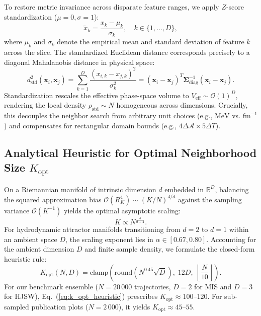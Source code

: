 To restore metric invariance across disparate feature ranges, we apply $Z$-score standardization (${\mu=0, \sigma=1}$):
\begin{equation}
    \tilde{x}_{k} = \frac{x_k - \mu_k}{\sigma_k}, \quad k \in \{1, \dots, D\},
\end{equation}
where $\mu_k$ and $\sigma_k$ denote the empirical mean and standard deviation of feature $k$ across the slice. The standardized Euclidean distance corresponds precisely to a diagonal Mahalanobis distance in physical space:
\begin{equation}
    d_{\mathrm{std}}^2(\mathbf{x}_i, \mathbf{x}_j) = \sum_{k=1}^D \frac{(x_{i,k} - x_{j,k})^2}{\sigma_k^2} = (\mathbf{x}_i - \mathbf{x}_j)^T \mathbf{\Sigma}_{\mathrm{diag}}^{-1} (\mathbf{x}_i - \mathbf{x}_j).
\end{equation}
Standardization rescales the effective phase-space volume to $V_{\mathrm{eff}} \sim \mathcal{O}(1)^D$, rendering the local density $\rho_{\mathrm{std}} \sim N$ homogeneous across dimensions. Crucially, this decouples the neighbor search from arbitrary unit choices (e.g., $\mathrm{MeV}$ vs. $\mathrm{fm}^{-1}$) and compensates for rectangular domain bounds (e.g., $4\Delta\mathcal{A} \times 5\Delta T$).

\subsection{Analytical Heuristic for Optimal Neighborhood Size $K_{\mathrm{opt}}$}
\label{subsec:analytical_heuristic}
On a Riemannian manifold of intrinsic dimension $d$ embedded in $\mathbb{R}^D$, balancing the squared approximation bias $\mathcal{O}(R_K^4) \sim (K/N)^{4/d}$ against the sampling variance $\mathcal{O}(K^{-1})$ yields the optimal asymptotic scaling:
\begin{equation}
    K \propto N^{\frac{4}{d+4}}.
\end{equation}
For hydrodynamic attractor manifolds transitioning from $d=2$ to $d=1$ within an ambient space $D$, the scaling exponent lies in $\alpha \in [0.67, 0.80]$. Accounting for the ambient dimension $D$ and finite sample density, we formulate the closed-form heuristic rule:
\begin{equation}
    K_{\mathrm{opt}}(N, D) = \mathrm{clamp}\left( \mathrm{round}\left( N^{0.45} \sqrt{D} \right), \; 12 D, \; \left\lfloor \frac{N}{10} \right\rfloor \right).
    \label{eq:k_opt_heuristic}
\end{equation}
For our benchmark ensemble ($N = 20\,000$ trajectories, $D=2$ for MIS and $D=3$ for HJSW), Eq.~(\ref{eq:k_opt_heuristic}) prescribes $K_{\mathrm{opt}} \approx 100$--$120$. For sub-sampled publication plots ($N = 2\,000$), it yields $K_{\mathrm{opt}} \approx 45$--$55$.

